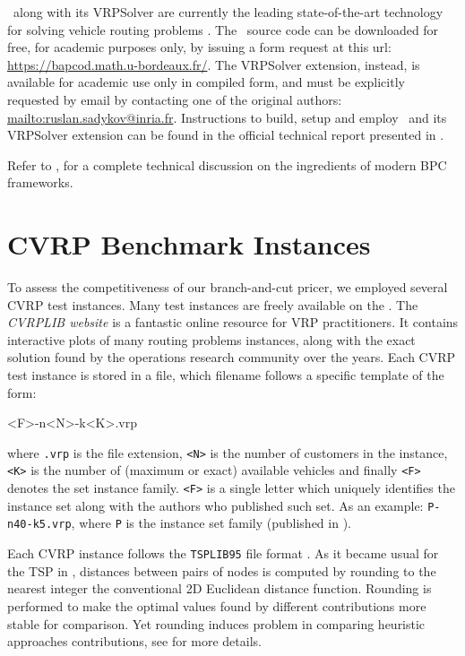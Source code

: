 \bapcod\ along with its VRPSolver are currently the leading state-of-the-art
technology for solving vehicle routing problems \parencite{pessoa2020a}.
The \bapcod\ source code can be downloaded for free, for academic purposes only,
by issuing a form request at this url: \url{https://bapcod.math.u-bordeaux.fr/}.
The VRPSolver extension, instead, is available for academic use only in compiled form,
and must be explicitly requested by email by contacting one of the
original authors: \url{mailto:ruslan.sadykov@inria.fr}.
Instructions to build, setup and employ \bapcod\ and its VRPSolver extension
can be found in the official technical report presented in \textcite{sadykov2021}.

Refer to \textcite{sadykov2019b},
for a complete technical discussion on the ingredients of modern BPC frameworks.


\section{CVRP Benchmark Instances}
\label{sec:results-benchmark-instances}

To assess the competitiveness of our branch-and-cut pricer, we employed several
CVRP test instances.
Many test instances are freely available on the .
The \textit{CVRPLIB website} is a fantastic online resource for VRP practitioners.
It contains interactive plots of many routing problems instances,
along with the exact solution found by the operations research community over the years.
Each CVRP test instance is stored in a file, which filename follows a specific template of the form:

\begin{center}
	\begin{LVerbatim}
		<F>-n<N>-k<K>.vrp
	\end{LVerbatim}
\end{center}

where \texttt{.vrp} is the file extension,
\texttt{<N>} is the number of customers in the instance,
\texttt{<K>} is the number of (maximum or exact) available vehicles
and finally \texttt{<F>} denotes the set instance family.
\texttt{<F>} is a single letter which uniquely identifies the instance
set along with the authors who published such set.
As an example: \texttt{P-n40-k5.vrp}, where \texttt{P} is the
instance set family (published in \textcite{augerat1995}).

Each CVRP instance follows the \texttt{TSPLIB95} file format \parencite{reinelt1995}.
As it became usual for the TSP in \textcite{reinelt1991},
distances between pairs of nodes
is computed by rounding to the nearest integer the conventional 2D Euclidean distance function.
Rounding is performed to make the optimal values found by different contributions more stable for comparison.
Yet rounding induces problem in comparing heuristic approaches contributions, see \textcite{uchoa2017} for more details.

